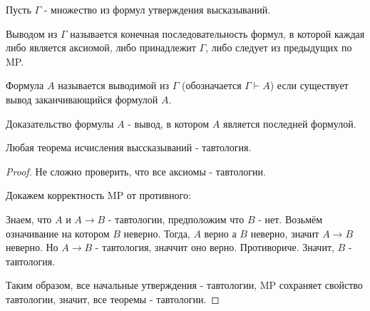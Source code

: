 \begin{definition} \thmslashn 

    Пусть $\Gamma$ - множество из формул утверждения высказываний.

    Выводом из $\Gamma$ называется конечная последовательность формул, в которой каждая либо является аксиомой, либо принадлежит $\Gamma$, либо следует из предыдущих по MP.

    Формула $A$ называется выводимой из $\Gamma$ (обозначается $\Gamma \vdash A$) если существует вывод заканчивающийся формулой $A$.

\end{definition}

\begin{definition}[Доказательство] \thmslashn 

    Доказательство формулы $A$ - вывод, в котором $A$ является последней формулой.
\end{definition}

\begin{theorem} \thmslashn

    Любая теорема исчисления выссказываний - тавтология.
    \begin{proof} \thmslashn
    
        Не сложно проверить, что все аксиомы - тавтологии.

        Докажем корректность MP от противного:

        Знаем, что $A$ и $A \to B$ - тавтологии, предположим что $B$ - нет. Возьмём означивание на котором $B$ неверно. Тогда, $A$ верно а $B$ неверно, значит $A \to B$ неверно. Но $A \to B$ - тавтология, значчит оно верно. Противориче. Значит, $B$ - тавтология.

        Таким образом, все начальные утверждения - тавтологии, MP сохраняет свойство тавтологии, значит, все теоремы - тавтологии.
    \end{proof}
\end{theorem}


